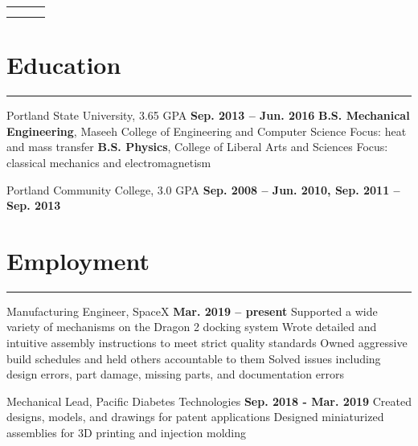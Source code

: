 

\newlength{\rcollength}\setlength{\rcollength}{3.0in}%
\begin{tabular} {
  p{}
  p{}
  p{}}
	\begin{flushleft}
		\address
	\end{flushleft}
	&
	\begin{center}
	\Large{\author}
	\end{center}
	&
	\begin{flushright}
		{\phnum}\\
 	    {\email} 	 
	\end{flushright}
\end{tabular}
\section{Education}
	\noindent\rule{\textwidth}{\hlinewidth}
	\begin{innerlist}
	\item Portland State University, 3.65 GPA	\hfill\textbf{Sep. 2013 -- Jun. 2016}
		\subitem \textbf{B.S. Mechanical Engineering}, Maseeh College of Engineering and Computer Science
		\subsubitem Focus: heat and mass transfer
		\subitem\textbf{B.S. Physics}, College of Liberal Arts and Sciences
		\subsubitem Focus: classical mechanics and electromagnetism
		\subitem 
	\item Portland Community College, 3.0 GPA	\hfill\textbf{Sep. 2008 -- Jun. 2010, Sep. 2011 -- Sep. 2013}
	\end{innerlist}
\vfill
\section{Employment}
\noindent\rule{\textwidth}{\hlinewidth}

\begin{innerlist}
	\item Manufacturing Engineer, SpaceX
		\hfill\textbf{Mar. 2019 -- present}
		\subitem Supported a wide variety of mechanisms on the Dragon 2 docking system
		\subitem Wrote detailed and intuitive assembly instructions to meet strict quality standards
		\subitem Owned aggressive build schedules and held others accountable to them
		\subitem Solved issues including design errors, part damage, missing parts, and documentation errors
	\item Mechanical Lead, Pacific Diabetes Technologies
		\hfill\textbf{Sep. 2018 - Mar. 2019} %
		\subitem Created designs, models, and drawings for patent applications
		\subitem Designed miniaturized assemblies for 3D printing and injection molding
\end{innerlist}
\vfill
